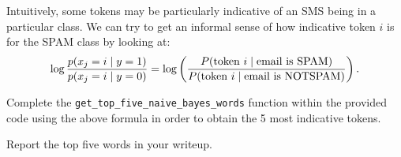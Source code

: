 \item {}
Intuitively, some tokens may be particularly indicative of an SMS being
in a particular class.  We can try to get an informal sense of how indicative
token $i$ is for the SPAM class by looking at:
\begin{equation*}
  \log \frac{p(x_j = i \mid y=1)}{p(x_j = i \mid y=0)}
  = \log\left(\frac{P(\hbox{token $i$} \mid \hbox{email is SPAM})}
    {P(\hbox{token $i$} \mid \hbox{email is NOTSPAM})}\right).
\end{equation*}

Complete the \texttt{get\_top\_five\_naive\_bayes\_words} function within the provided code using the above formula in order to obtain the 5 most indicative tokens.

Report the top five words in your writeup.

